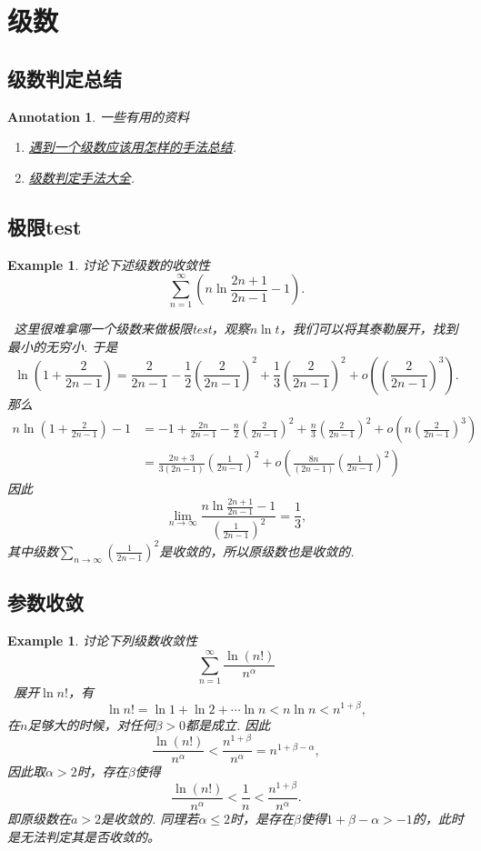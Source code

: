 \documentclass{article}
\newtheorem{example}[theorem]{Example}
\newtheorem{annotation}[theorem]{Annotation}
\newcommand{\hints}{{\color{blue} \text{hints}}}
\begin{document}
\newpage
\section{级数}

\subsection{级数判定总结}

\begin{annotation}
\rm 一些有用的资料
\begin{enumerate}
	\item \href{https://sites.lafayette.edu/thompsmc/files/2016/03/Series_Summary.pdf}{遇到一个级数应该用怎样的手法总结}.
	\item \href{https://en.wikipedia.org/wiki/Convergence_tests}{级数判定手法大全}.
\end{enumerate}
\end{annotation}

\subsection{极限test}

\begin{example}
\rm 讨论下述级数的收敛性
$$
\sum\limits_{n=1}^\infty (n\ln\frac{2n+1}{2n-1} -1). 
$$

\hints\ 这里很难拿哪一个级数来做极限test，观察$n\ln t$，我们可以将其泰勒展开，找到最小的无穷小. 于是
$$
\ln(1+\frac{2}{2n-1}) = \frac{2}{2n-1} - \frac{1}{2}(\frac{2}{2n-1})^2 +  \frac{1}{3}(\frac{2}{2n-1})^2 + o((\frac{2}{2n-1})^3). 
$$
那么
$$
\begin{array}{ll}
n\ln(1+\frac{2}{2n-1}) - 1 &= -1 + \frac{2n}{2n-1} - \frac{n}{2}(\frac{2}{2n-1})^2 +  \frac{n}{3}(\frac{2}{2n-1})^2 + o(n(\frac{2}{2n-1})^3) \\
&= \frac{2n+3}{3(2n-1)}(\frac{1}{2n-1})^2 + o(\frac{8n}{(2n-1)}(\frac{1}{2n-1})^2)
\end{array}
$$
因此
$$
\lim\limits_{n \to \infty} \frac{n\ln\frac{2n+1}{2n-1} -1}{(\frac{1}{2n-1})^2} = \frac{1}{3},
$$
其中级数$\sum\limits_{n \to \infty}(\frac{1}{2n-1})^2$是收敛的，所以原级数也是收敛的. 
\end{example} 

\subsection{参数收敛}
\begin{example}
\rm 讨论下列级数收敛性
$$
\sum\limits_{n=1}^{\infty} \frac{\ln (n!)}{n^\alpha}
$$
\hints\ 展开$\ln n!$，有
$$
\ln n! = \ln 1 + \ln 2 + \cdots \ln n < n\ln n < n^{1+\beta},
$$
在$n$足够大的时候，对任何$\beta > 0$都是成立. 因此
$$
\frac{\ln (n!)}{n^\alpha} < \frac{n^{1+\beta}}{n^\alpha} = n^{1+\beta - \alpha},
$$
因此取$\alpha > 2$时，存在$\beta$使得
$$
\frac{\ln (n!)}{n^\alpha} < \frac{1}{n} < \frac{n^{1+\beta}}{n^\alpha}. 
$$
即原级数在$a > 2$是收敛的. 同理若$\alpha \leq 2$时，是存在$\beta$使得$1+\beta-\alpha > -1$的，此时是无法判定其是否收敛的。 
\end{example}
\end{document}
